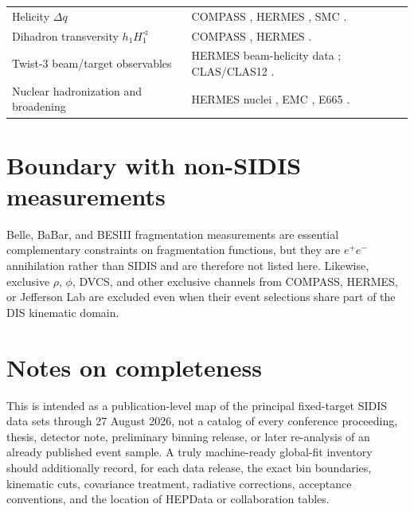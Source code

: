 \documentclass[11pt]{article}
\begin{document}
\begin{center}
\begin{tabular}{@{}p{}p{}@{}}
Helicity $\Delta q$ &
COMPASS \cite{COMPASS:helicityD2009,COMPASS:helicityHD2010},
HERMES \cite{HERMES:helicity2005,HERMES:ALL2019},
SMC \cite{SMC:semi1998}. \\

Dihadron transversity $h_1 H_1^{\sphericalangle}$ &
COMPASS \cite{COMPASS:dihadron2012,COMPASS:dihadronP2014,COMPASS:dihadronD2026},
HERMES \cite{HERMES:dihadron2008}. \\

Twist-3 beam/target observables &
HERMES beam-helicity data \cite{HERMES:beamhel2019}; CLAS/CLAS12
\cite{CLAS:BSA2004,CLAS:BSA2014,CLAS:dihadron2021,CLAS12:dihadron2021,
CLAS12:piBSA2022}. \\

Nuclear hadronization and broadening &
HERMES nuclei \cite{HERMES:nuclear2003,HERMES:nuclear2007,HERMES:broadening2010},
EMC \cite{EMC:nuclear1991}, E665 \cite{E665:z1994}. \\
\bottomrule
\end{tabular}
\normalsize
\end{center}

\section{Boundary with non-SIDIS measurements}

Belle, BaBar, and BESIII fragmentation measurements are essential complementary constraints on
fragmentation functions, but they are $e^+e^-$ annihilation rather than SIDIS and are therefore not
listed here.  Likewise, exclusive $\rho$, $\phi$, DVCS, and other exclusive channels from COMPASS,
HERMES, or Jefferson Lab are excluded even when their event selections share part of the DIS
kinematic domain.

\section{Notes on completeness}

This is intended as a publication-level map of the principal fixed-target SIDIS data sets through
27 August 2026, not a catalog of every conference proceeding, thesis, detector note, preliminary
binning release, or later re-analysis of an already published event sample.  A truly machine-ready
global-fit inventory should additionally record, for each data release, the exact bin boundaries,
kinematic cuts, covariance treatment, radiative corrections, acceptance conventions, and the
location of HEPData or collaboration tables.



\end{document}
